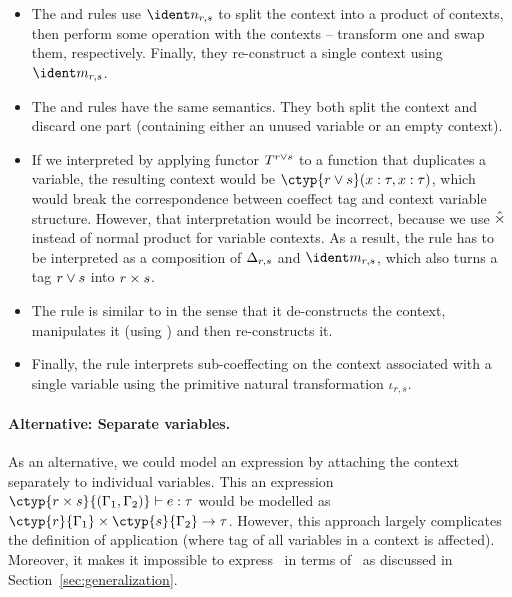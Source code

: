 \begin{itemize}
\item The  and  rules use $\csplit_{r, s}$ to split the context into a product
  of contexts, then perform some operation with the contexts -- transform one and swap them, respectively.
  Finally, they re-construct a single context using $\cmerge_{r, s}$.

\item The  and  rules have the same semantics. They both split the context
  and discard one part (containing either an unused variable or an empty context).

\item If we interpreted  by applying functor $T^{r\vee s}$ to a function that duplicates
  a variable, the resulting context would be $\ctyp{r \csvop s}(x:\tau, x:\tau)$, which would break the
  correspondence between coeffect tag and context variable structure. However, that interpretation would be
  incorrect, because we use $\hat{\times}$ instead of normal product for variable contexts. As a result, the
  rule has to be interpreted as a composition of $\Delta_{r, s}$ and $\cmerge_{r, s}$, which also turns
  a tag $r \vee s$ into $r \times s$.

\item The  rule is similar to  in the sense that it de-constructs the context,
  manipulates it (using ) and then re-constructs it.

\item Finally, the  rule interprets sub-coeffecting on the context associated with a single
  variable using the primitive natural transformation $\iota_{r, s}$.
\end{itemize}

\paragraph{Alternative: Separate variables.} As an alternative, we could model an expression by
attaching the context separately to individual variables. This an expression
$\ctyp{r \csprd s}{(\Gamma_1, \Gamma_2)} \vdash e : \tau$ would be modelled as 
$\ctyp{r}{\Gamma_1} \times \ctyp{s}{\Gamma_2} \rightarrow \tau$. However, this 
approach largely complicates the definition of application (where tag of all 
variables in a context is affected). Moreover, it makes it impossible to express
\clflt~in terms of \clstr~as discussed in Section~\ref{sec:generalization}.

